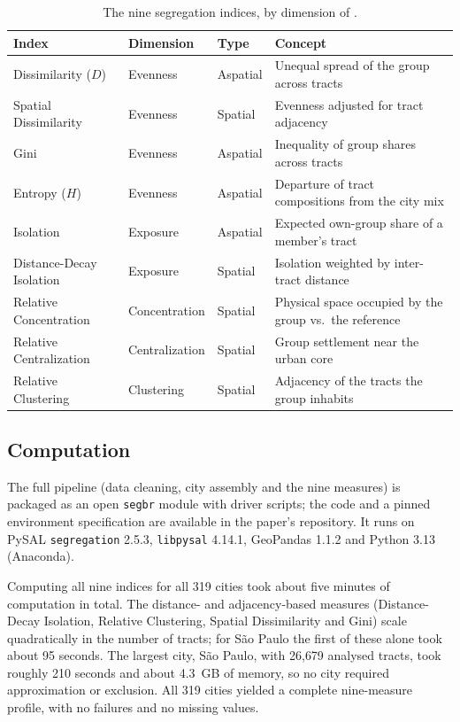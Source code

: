 \documentclass[12pt,a4paper]{article}
\begin{document}
\begin{table}[h]
\centering
\caption{The nine segregation indices, by dimension of \citet{massey1988dimensions}.}
\label{tab:measures}
\small
\begin{tabular}{lllp{6cm}}
\toprule
Index & Dimension & Type & Concept \\
\midrule
Dissimilarity ($D$) & Evenness & Aspatial & Unequal spread of the group across tracts \\
Spatial Dissimilarity & Evenness & Spatial & Evenness adjusted for tract adjacency \\
Gini & Evenness & Aspatial & Inequality of group shares across tracts \\
Entropy ($H$) & Evenness & Aspatial & Departure of tract compositions from the city mix \\
Isolation & Exposure & Aspatial & Expected own-group share of a member's tract \\
Distance-Decay Isolation & Exposure & Spatial & Isolation weighted by inter-tract distance \\
Relative Concentration & Concentration & Spatial & Physical space occupied by the group vs.\ the reference \\
Relative Centralization & Centralization & Spatial & Group settlement near the urban core \\
Relative Clustering & Clustering & Spatial & Adjacency of the tracts the group inhabits \\
\bottomrule
\end{tabular}
\end{table}

\subsection{Computation}\label{subsec:computation}

The full pipeline (data cleaning, city assembly and the nine measures) is packaged as an open \texttt{segbr} module with driver scripts; the code and a pinned environment specification are available in the paper's repository. It runs on PySAL \texttt{segregation} 2.5.3, \texttt{libpysal} 4.14.1, GeoPandas 1.1.2 and Python 3.13 (Anaconda).

Computing all nine indices for all 319 cities took about five minutes of computation in total. The distance- and adjacency-based measures (Distance-Decay Isolation, Relative Clustering, Spatial Dissimilarity and Gini) scale quadratically in the number of tracts; for S\~ao Paulo the first of these alone took about 95 seconds. The largest city, S\~ao Paulo, with 26{,}679 analysed tracts, took roughly 210 seconds and about 4.3~GB of memory, so no city required approximation or exclusion. All 319 cities yielded a complete nine-measure profile, with no failures and no missing values.
\end{document}
